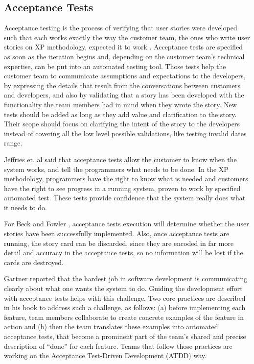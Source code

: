 \subsection{\label{chap:chap2_acceptance_tests}Acceptance Tests}

Acceptance testing is the process of verifying that user stories were developed such that each works exactly the way the customer team, the ones who write user stories on XP methodology, expected it to work \cite{Cohn_2004}. Acceptance tests are specified as soon as the iteration begins and, depending on the customer team's technical expertise, can be put into an automated testing tool. Those tests help the customer team to communicate assumptions and expectations to the developers, by expressing the details that result from the conversations between customers and developers, and also by validating that a story has been developed with the functionality the team members had in mind when they wrote the story. New tests should be added as long as they add value and clarification to the story. Their scope should focus on clarifying the intent of the story to the developers instead of covering all the low level possible validations, like testing invalid dates range.

Jeffries et. al \cite{Jeffries_et_dot_al_2000} said that acceptance tests allow the customer to know when the system works, and tell the programmers what needs to be done. In the XP methodology, programmers have the right to know what is needed and customers have the right to see progress in a running system, proven to work by specified automated test. These tests provide confidence that the system really does what it needs to do.

For Beck and Fowler \cite{Beck_Fowler_2000}, acceptance tests execution will determine whether the user stories have been successfully implemented. Also, once acceptance tests are running, the story card can be discarded, since they are encoded in far more detail and accuracy in the acceptance tests, so no information will be lost if the cards are destroyed.

Gartner \cite{Gartner_2012} reported that the hardest job in software development is communicating clearly about what one wants the system to do. Guiding the development effort with acceptance tests helps with this challenge. Two core practices are described in his book to address such a challenge, as follows: (a) before implementing each feature, team members collaborate to create concrete examples of the feature in action and (b) then the team translates these examples into automated acceptance tests, that become a prominent part of the team's shared and precise description of ``done'' for each feature. Teams that follow those practices are working on the Acceptance Test-Driven Development (ATDD) way.

